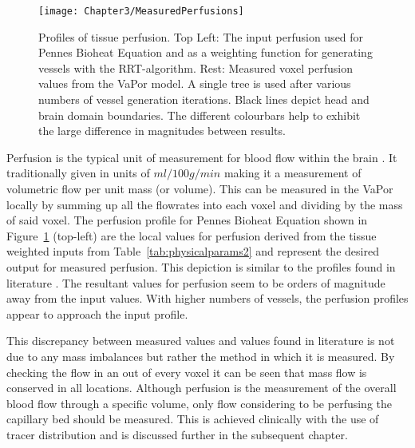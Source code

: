 \documentclass[11pt,english,a4paper,twoside,openright]{report}
\begin{document}
{{{{{{{{\begin{figure}[t]
	\centering
	\texttt{[image: Chapter3/MeasuredPerfusions]}
	\caption[Profiles of tissue perfusion using the VaPor model at various levels of vessel generation compared to the input perfusion used in Pennes Bioheat Equation]{Profiles of tissue perfusion. Top Left: The input perfusion used for Pennes Bioheat Equation and as a weighting function for generating vessels with the RRT-algorithm. Rest: Measured voxel perfusion values from the VaPor model. A single tree is used after various numbers of vessel generation iterations. Black lines depict head and brain domain boundaries. The different colourbars help to exhibit the large difference in magnitudes between results.}
	\label{fig:MeasuredPerfusion}
\end{figure}

Perfusion is the typical unit of measurement for blood flow within the brain \cite{sourbron2013classic}. It traditionally given in units of $ml/100g/min$ making it a measurement of volumetric flow per unit mass (or volume). This can be measured in the VaPor locally by summing up all the flowrates into each voxel and dividing by the mass of said voxel. The perfusion profile for Pennes Bioheat Equation shown in Figure~\ref{fig:MeasuredPerfusion} (top-left) are the local values for perfusion derived from the tissue weighted inputs from Table~\ref{tab:physicalparams2} and represent the desired output for measured perfusion. This depiction is similar to the profiles found in literature \cite{sourbron2009quantification}. The resultant values for perfusion seem to be orders of magnitude away from the input values. With higher numbers of vessels, the perfusion profiles appear to approach the input profile.

This discrepancy between measured values and values found in literature is not due to any mass imbalances but rather the method in which it is measured. By checking the flow in an out of every voxel it can be seen that mass flow is conserved in all locations. Although perfusion is the measurement of the overall blood flow through a specific volume, only flow considering to be perfusing the capillary bed should be measured. This is achieved clinically with the use of tracer distribution and is discussed further in the subsequent chapter. 

}}}}}}}}
\end{document}
